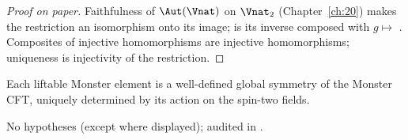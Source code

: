 \begin{proof}[Proof on paper]
Faithfulness of $\Aut(\Vnat)$ on $\Vnat_2$ (Chapter~\ref{ch:20}) makes the restriction an isomorphism onto
its image;  is its inverse composed with $g\mapsto$ .  Composites of
injective homomorphisms are injective homomorphisms; uniqueness is injectivity of the restriction.
\end{proof}
\begin{physics}
Each liftable Monster element is a well-defined global symmetry of the Monster CFT, uniquely
determined by its action on the spin-two fields.
\end{physics}
\begin{status}
No hypotheses (except  where displayed); audited in
.
\end{status}

